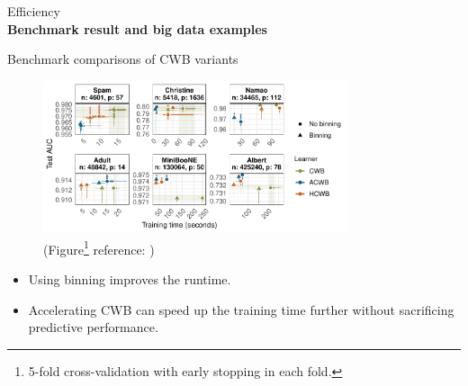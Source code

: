 \documentclass[t,10pt]{beamer}
\newcommand{\fSlide}[2]{
\begin{frame}[plain]{}%
  \vspace{4cm}%
  \Large #1\\[0.2cm]%
  {\LARGE\textbf{#2}}%
	\addtocounter{framenumber}{-1}%
\end{frame}%
}
\begin{document}
\fSlide{Efficiency}{Benchmark result and big data examples}


\begin{frame}{Benchmark comparisons of CWB variants}
  \begin{figure}
    \centering
    \includegraphics[width=0.8\textwidth]{figures/fig-cacb-benchmark.pdf}
    \caption{\small(Figure\footnote[frame,1]{5-fold cross-validation with early stopping in each fold.} reference: \citet{schalk2022accelerated})}
  \end{figure}\vspace{-0.3cm}
  \begin{itemize}
      \item Using binning improves the runtime.
      \item Accelerating CWB can speed up the training time further without sacrificing predictive performance.
  \end{itemize}
\end{frame}
\end{document}
